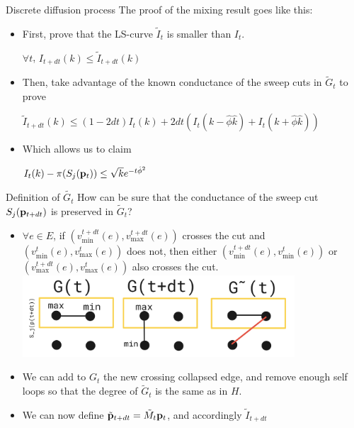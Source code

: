 \documentclass[../main.tex]{subfiles}
\begin{document}
	\begin{frame}{Discrete diffusion process}
		The proof of the mixing result goes like this:
		\begin{itemize}
				\item First, prove that the LS-curve $\tilde{I}_t$ is smaller than $I_t$. 
				\begin{lemma}
					\label{lemma:ls_curve_smaller_ls_curve_tilde}
					$\forall t$, 
					$I_{t+dt}(k) \leq \tilde{I}_{t+dt}(k)$
				\end{lemma} 
			\item Then, take advantage of the known conductance of the sweep cuts in $\tilde{G}_t$ to prove
				\begin{lemma}
					\label{lemma:recursive_LS_lower_bound}
					$\tilde{I}_{t+dt}(k) \leq (1-2dt) I_t(k) + 2dt (I_t(k-\hat{\phi} \hat{k}) + I_t(k + \hat{\phi}\hat{k}))$
				\end{lemma}
			\item Which allows us to claim
				\begin{lemma}
					\label{lemma:mixing_result} 
					$I_t(k) - \pi(S_j(\bold{p}_t)) \leq \sqrt{k} e^{-t \hat{\phi}^2}$
				\end{lemma}
		\end{itemize}
	\end{frame}

	\begin{frame}{Definition of $\tilde{G_t}$}
		How can be sure that the conductance of the sweep cut $S_j(\bold{p}_{t+dt})$ is preserved in $\tilde{G}_t$?
		
		\begin{itemize}
			\item $\forall e\in E$, if $(v_{\text{min}}^{t+dt}(e), v_{\text{max}}^{t+dt}(e))$ crosses the cut and $(v_{\text{min}}^{t}(e), v_{\text{max}}^{t}(e))$ does not, then either $(v_{\text{min}}^{t+dt}(e), v_{\text{min}}^{t}(e))$ or $(v_{\text{max}}^{t+dt}(e), v_{\text{max}}^{t}(e))$ also crosses the cut.
			\includegraphics[width=0.8\textwidth]{Figures/G_tilde_creation}
			\item We can add to $G_t$ the new crossing collapsed edge, and remove enough self loops so that the degree of $\tilde{G}_t$ is the same as in $H$.
			\item We can now define $\tilde{\bold{p}}_{t+dt} = \tilde{M}_t \bold{p}_t$, and accordingly $\tilde{I}_{t+dt}$
		\end{itemize}
	\end{frame}
\end{document}
